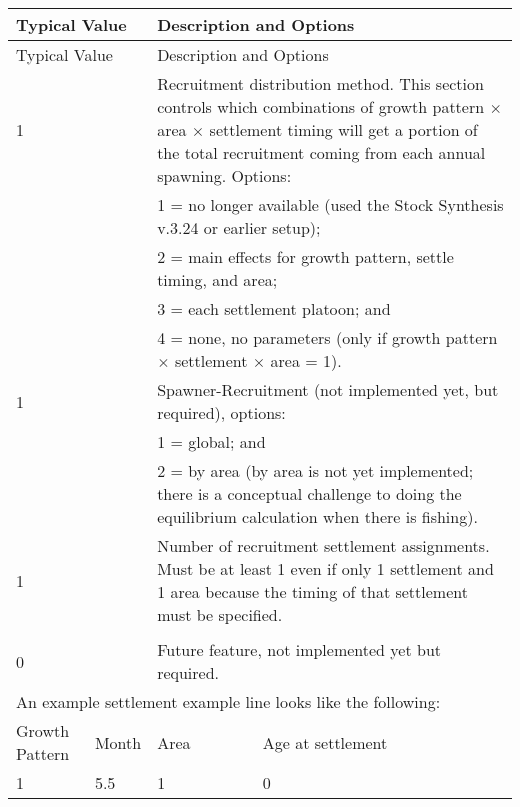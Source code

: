 \begin{center}
	\begin{longtable}{p{1.25cm} p{1.25cm} p{1cm} p{11.5cm}}
		\hline
		\multicolumn{2}{l}{Typical Value} & \multicolumn{2}{l}{Description and Options} \Tstrut\Bstrut\\
		\hline
		\endfirsthead
		
		\hline
		\multicolumn{2}{l}{Typical Value} & \multicolumn{2}{l}{Description and Options} \Tstrut\Bstrut\\
		\hline
		\endhead
		
		\hline
		\endfoot
		
		\endlastfoot
		
		1 & & \multicolumn{2}{l}{\parbox{12.5cm}{Recruitment distribution method. This section controls which combinations of growth pattern $\times$ area $\times$ settlement timing will get a portion of the total recruitment coming from each annual spawning. Options:}} \Tstrut\Bstrut\\
		& & \multicolumn{2}{l}{\parbox{12.5cm}{1 = no longer available (used the Stock Synthesis v.3.24 or earlier setup);}} \\
		& & \multicolumn{2}{l}{\parbox{12.5cm}{2 = main effects for growth pattern, settle timing, and area;}} \\
		& & \multicolumn{2}{l}{\parbox{12.5cm}{3 = each settlement platoon; and}} \\
		& & \multicolumn{2}{l}{\parbox{12.5cm}{4 = none, no parameters (only if growth pattern $\times$ settlement $\times$ area = 1).}} \Bstrut\\
		
		\hline
		1 & & \multicolumn{2}{l}{Spawner-Recruitment (not implemented yet, but required), options:} \Tstrut\\
		& & \multicolumn{2}{l}{1 = global; and} \\
		& & \multicolumn{2}{l}{\parbox{12.5cm}{2 = by area (by area is not yet implemented; there is a conceptual challenge to doing the equilibrium calculation when there is fishing).}} \Bstrut\\
		
		\hline
		1 & & \multicolumn{2}{l}{\parbox{12.5cm}{Number of recruitment settlement assignments. Must be at least 1 even if only 1 settlement and 1 area because the timing of that settlement must be specified.}} \Tstrut\Bstrut\\ 
		& & \\
		
		\hline
		0 \Tstrut & & \multicolumn{2}{l}{Future feature, not implemented yet but required.} \Bstrut\\

		\hline
		\multicolumn{4}{l}{An example settlement example line looks like the following:} \Tstrut\Bstrut\\
		
		\hline
		Growth Pattern & Month & Area & Age at settlement \Tstrut\\
		\hline
		1 & 5.5 & 1 & 0 \Tstrut\Bstrut\\
		\hline
	\end{longtable}
	\vspace*{-\baselineskip}
\end{center}

